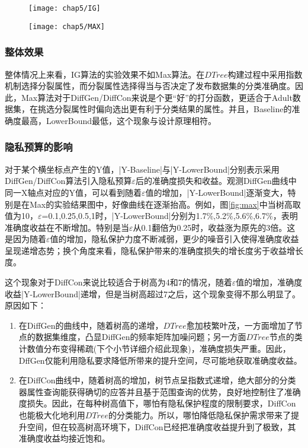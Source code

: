\begin{figure}[!htp]
	\centering
	\texttt{[image: chap5/IG]}
\end{figure}

\begin{figure}[!htp]
	\centering
	\texttt{[image: chap5/MAX]}
\end{figure}

\subsubsection{整体效果}    
整体情况上来看，IG算法的实验效果不如Max算法。在$DTree$构建过程中采用指数机制选择分裂属性，而分裂属性选择得当与否决定了发布数据集的分类准确度。因此，Max算法对于DiffGen/DiffCon来说是个更“好”的打分函数，更适合于Adult数据集，在挑选分裂属性时偏向选出更有利于分类结果的属性。并且，Baseline的准确度最高，LowerBound最低，这个现象与设计原理相符。

\subsubsection{隐私预算的影响}   
对于某个横坐标点产生的Y值，|Y-Baseline|与|Y-LowerBound|分别表示采用DiffGen/DiffCon算法引入隐私预算$\varepsilon$后的准确度损失和收益。观测DiffGen曲线中同一X轴点对应的Y值，可以看到随着$\varepsilon$值的增加，|Y-LowerBound|逐渐变大，特别是在Max的实验结果图中，好像曲线在逐渐抬高。例如，图\ref{fig:max}中当树高取值为10，$\varepsilon$=0.1,0.25,0.5,1时，|Y-LowerBound|分别为1.7\%,5.2\%,5.6\%,6.7\%，表明准确度收益在不断增加。特别是当$\varepsilon$从0.1翻倍为0.25时，收益涨为原先的3倍。这是因为随着$\varepsilon$值的增加，隐私保护力度不断减弱，更少的噪音引入使得准确度收益呈现递增态势；换个角度来看，隐私保护带来的准确度损失的增长度劣于收益增长度。

这个现象对于DiffCon来说比较适合于树高为4和7的情况，随着$\varepsilon$值的增加，准确度收益|Y-LowerBound|递增，但是当树高超过7之后，这个现象变得不那么明显了。原因如下：
\begin{enumerate}
	\item 在DiffGen的曲线中，随着树高的递增，$DTree$愈加枝繁叶茂，一方面增加了节点的数据集维度，凸显DiffGen的频率矩阵加噪问题；另一方面$DTree$节点的类计数值分布变得稀疏(下个小节详细介绍此现象)，准确度损失严重。因此，DffGen仅能利用隐私要求降低所带来的提升空间，尽可能地获取准确度收益。
	\item 在DiffCon曲线中，随着树高的增加，树节点呈指数式递增，绝大部分的分类器属性查询能获得确切的应答并且基于范围查询的优势，良好地控制住了准确度损失。因此，在每种树高值下，哪怕有隐私保护程度的限制要求，DiffCon也能极大化地利用$DTree$的分类能力。所以，哪怕降低隐私保护需求带来了提升空间，但在较高树高环境下，DiffCon已经把准确度收益提升到了极致，其准确度收益均接近饱和。
\end{enumerate}


